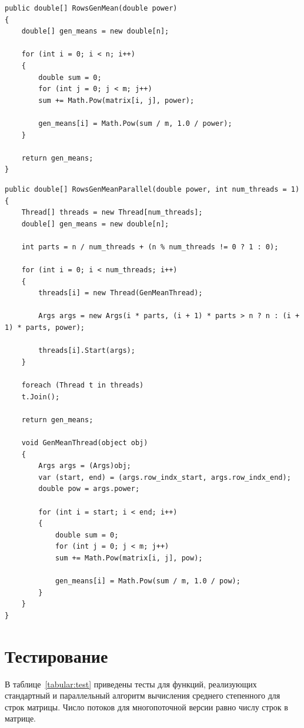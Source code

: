 \documentclass[12pt]{report}
\begin{document}
\captionsetup{singlelinecheck = false, justification=raggedright}
\begin{lstlisting}[label=base_code,caption=Стандартный метод вычисления среднего степенного для строк матрицы]
public double[] RowsGenMean(double power)
{
	double[] gen_means = new double[n];
	
	for (int i = 0; i < n; i++)
	{
		double sum = 0;
		for (int j = 0; j < m; j++)
		sum += Math.Pow(matrix[i, j], power);
		
		gen_means[i] = Math.Pow(sum / m, 1.0 / power);
	}
	
	return gen_means;
}
\end{lstlisting}
\newpage
\begin{lstlisting}[label=vin_code,caption=Параллельный метод вычисления среднего степенного для строк матрицы]
public double[] RowsGenMeanParallel(double power, int num_threads = 1)
{
	Thread[] threads = new Thread[num_threads];
	double[] gen_means = new double[n];
	
	int parts = n / num_threads + (n % num_threads != 0 ? 1 : 0);
	
	for (int i = 0; i < num_threads; i++)
	{
		threads[i] = new Thread(GenMeanThread);
		
		Args args = new Args(i * parts, (i + 1) * parts > n ? n : (i + 1) * parts, power);
		
		threads[i].Start(args);
	}
	
	foreach (Thread t in threads)
	t.Join();
	
	return gen_means;
	
	void GenMeanThread(object obj)
	{
		Args args = (Args)obj;
		var (start, end) = (args.row_indx_start, args.row_indx_end);
		double pow = args.power;
		
		for (int i = start; i < end; i++)
		{
			double sum = 0;
			for (int j = 0; j < m; j++)
			sum += Math.Pow(matrix[i, j], pow);
			
			gen_means[i] = Math.Pow(sum / m, 1.0 / pow);
		}
	}
}
\end{lstlisting}
\captionsetup{singlelinecheck = false, justification=centering}

\newpage

\section{Тестирование}

В таблице~\ref{tabular:test} приведены тесты для функций, реализующих стандартный и параллельный алгоритм вычисления среднего степенного для строк матрицы. Число потоков для многопоточной версии равно числу строк в матрице.
\end{document}
